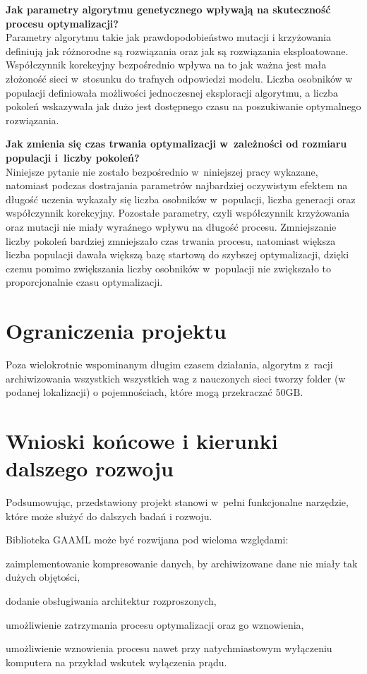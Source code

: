 \textbf{%
  Jak parametry algorytmu genetycznego wpływają
  na skuteczność procesu optymalizacji?%
}\\
Parametry algorytmu takie jak prawdopodobieństwo mutacji i krzyżowania definiują jak różnorodne są rozwiązania oraz jak są rozwiązania eksploatowane. Współczynnik korekcyjny bezpośrednio wpływa na to jak ważna jest mała złożoność sieci w~stosunku do trafnych odpowiedzi modelu.
Liczba osobników w populacji definiowała możliwości jednoczesnej eksploracji algorytmu, a liczba pokoleń wskazywała jak dużo jest dostępnego czasu na poszukiwanie optymalnego rozwiązania.

\textbf{%
  Jak zmienia się czas trwania optymalizacji
  w~zależności od rozmiaru populacji i~liczby pokoleń?%
}\\
Niniejsze pytanie nie zostało bezpośrednio
w~niniejszej pracy wykazane,
natomiast podczas dostrajania parametrów
najbardziej oczywistym efektem na długość
uczenia wykazały się liczba osobników w~populacji,
liczba generacji oraz współczynnik korekcyjny.
Pozostałe parametry, czyli współczynnik krzyżowania
oraz mutacji nie miały wyraźnego wpływu na długość procesu.
Zmniejszanie liczby pokoleń bardziej
zmniejszało czas trwania procesu,
natomiast większa liczba populacji dawała większą
bazę startową do szybszej optymalizacji,
dzięki czemu pomimo zwiększania liczby osobników w~populacji
nie zwiększało to proporcjonalnie czasu optymalizacji.

\section*{Ograniczenia projektu}
Poza wielokrotnie wspominanym długim czasem działania, algorytm z~racji archiwizowania wszystkich wszystkich wag z nauczonych sieci tworzy folder (w podanej lokalizacji) o pojemnościach, które mogą przekraczać $50\text{GB}$.

\section*{Wnioski końcowe i kierunki dalszego rozwoju}
Podsumowując, przedstawiony projekt stanowi w~pełni funkcjonalne narzędzie, które może służyć do dalszych badań i rozwoju.

Biblioteka \gls{GAAML} może być rozwijana pod wieloma względami:
\begin{nospitemize}
  \item zaimplementowanie kompresowanie danych,
    by archiwizowane dane nie miały tak dużych objętości,
  \item dodanie obsługiwania architektur rozproszonych,
  \item umożliwienie zatrzymania procesu optymalizacji
    oraz go wznowienia,
  \item umożliwienie wznowienia procesu nawet
    przy natychmiastowym wyłączeniu komputera
    na przykład wskutek wyłączenia prądu.
\end{nospitemize}

